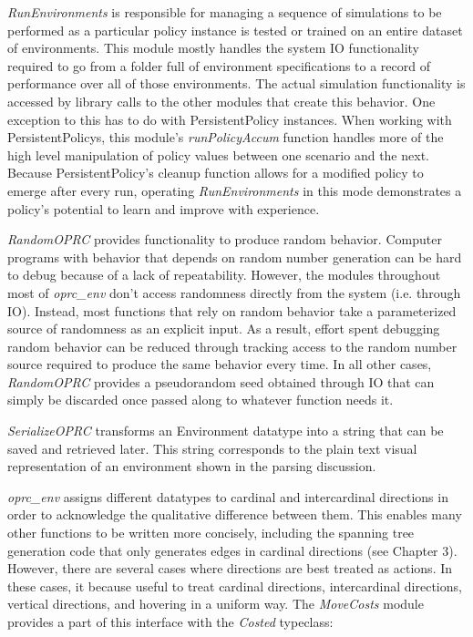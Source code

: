 \textit{RunEnvironments} is responsible for managing a sequence of simulations to be performed as a particular policy instance is tested or trained on an entire dataset of environments. This module mostly handles the system IO functionality required to go from a folder full of environment specifications to a record of performance over all of those environments. The actual simulation functionality is accessed by library calls to the other modules that create this behavior. One exception to this has to do with PersistentPolicy instances. When working with PersistentPolicys, this module's \textit{runPolicyAccum} function handles more of the high level manipulation of policy values between one scenario and the next. Because PersistentPolicy's cleanup function allows for a modified policy to emerge after every run, operating \textit{RunEnvironments} in this mode demonstrates a policy's potential to learn and improve with experience.

\textit{RandomOPRC} provides functionality to produce random behavior. Computer programs with behavior that depends on random number generation can be hard to debug because of a lack of repeatability. However, the modules throughout most of \textit{oprc\_env} don't access randomness directly from the system (i.e. through IO). Instead, most functions that rely on random behavior take a parameterized source of randomness as an explicit input. As a result, effort spent debugging random behavior can be reduced through tracking access to the random number source required to produce the same behavior every time. In all other cases, \textit{RandomOPRC} provides a pseudorandom seed obtained through IO that can simply be discarded once passed along to whatever function needs it.

\textit{SerializeOPRC} transforms an Environment datatype into a string that can be saved and retrieved later. This string corresponds to the plain text visual representation of an environment shown in the parsing discussion.

\textit{oprc\_env} assigns different datatypes to cardinal and intercardinal directions in order to acknowledge the qualitative difference between them. This enables many other functions to be written more concisely, including the spanning tree generation code that only generates edges in cardinal directions (see Chapter 3). However, there are several cases where directions are best treated as actions. In these cases, it because useful to treat cardinal directions, intercardinal directions, vertical directions, and hovering in a uniform way. The \textit{MoveCosts} module provides a part of this interface with the \textit{Costed} typeclass:

